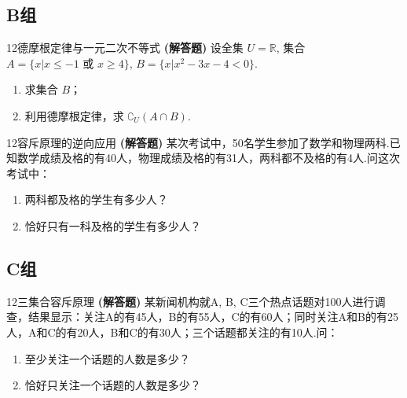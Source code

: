 \subsection*{B组}

\begin{exercise}{12}{德摩根定律与一元二次不等式}
	\textbf{(解答题)} 设全集 $U=\mathbb{R}$, 集合 $A=\{x|x \le -1 \text{ 或 } x \ge 4\}$, $B=\{x| x^2-3x-4<0\}$.
	\begin{enumerate}
		\item 求集合 $B$；
		\item 利用德摩根定律，求 $\complement_U(A \cap B)$.
	\end{enumerate}
\end{exercise}

\begin{exercise}{12}{容斥原理的逆向应用}
	\textbf{(解答题)} 某次考试中，50名学生参加了数学和物理两科.已知数学成绩及格的有40人，物理成绩及格的有31人，两科都不及格的有4人.问这次考试中：
	\begin{enumerate}
		\item 两科都及格的学生有多少人？
		\item 恰好只有一科及格的学生有多少人？
	\end{enumerate}
\end{exercise}

\subsection*{C组}

\begin{exercise}{12}{三集合容斥原理}
	\textbf{(解答题)} 某新闻机构就A, B, C三个热点话题对100人进行调查，结果显示：关注A的有45人，B的有55人，C的有60人；同时关注A和B的有25人，A和C的有20人，B和C的有30人；三个话题都关注的有10人.问：
	\begin{enumerate}
		\item 至少关注一个话题的人数是多少？
		\item 恰好只关注一个话题的人数是多少？
	\end{enumerate}
\end{exercise}

\stopexercise
